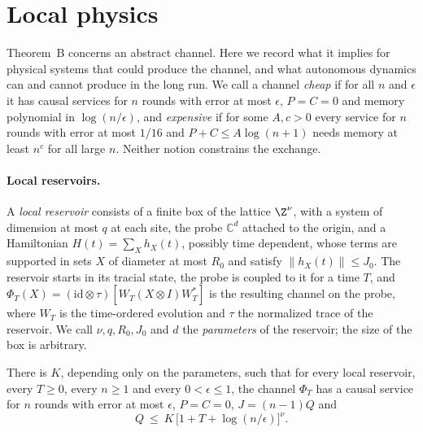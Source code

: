 \section{Local physics}\label{sec:physics}

Theorem~B concerns an abstract channel. Here we record what it implies for physical systems that could produce the channel, and what
autonomous dynamics can and cannot produce in the long run. We call a channel \emph{cheap} if for all $n$ and $\epsilon$ it has causal
services for $n$ rounds with error at most $\epsilon$, $P=C=0$ and memory polynomial in $\log(n/\epsilon)$, and \emph{expensive} if for some
$A,c>0$ every service for $n$ rounds with error at most $1/16$ and $P+C\le A\log(n+1)$ needs memory at least $n^c$ for all large $n$. Neither notion
constrains the exchange.

\paragraph{Local reservoirs.} A \emph{local reservoir} consists of a finite box of the lattice $\Z^\nu$, with a system of dimension at most $q$ at
each site, the probe $\mathbb C^d$ attached to the origin, and a Hamiltonian $H(t)=\sum_Xh_X(t)$, possibly time dependent, whose terms are supported
in sets $X$ of diameter at most $R_0$ and satisfy $\|h_X(t)\|\le J_0$. The reservoir starts in its tracial state, the probe is coupled to it for a
time $T$, and $\Phi_T(X)=(\mathrm{id}\otimes\tau)[W_T(X\otimes I)W_T^*]$ is the resulting channel on the probe, where $W_T$ is the time-ordered
evolution and $\tau$ the normalized trace of the reservoir. We call $\nu,q,R_0,J_0$ and $d$ the \emph{parameters} of the reservoir; the size of the
box is arbitrary.

\begin{proposition}\label{prop:light-cone}
There is $K$, depending only on the parameters, such that for every local reservoir, every $T\ge0$, every $n\ge1$ and every $0<\epsilon\le1$, the
channel $\Phi_T$ has a causal service for $n$ rounds with error at most $\epsilon$, $P=C=0$, $J=(n-1)Q$ and
\[
Q\ \le\ K\,\bigl[1+T+\log(n/\epsilon)\bigr]^\nu .
\]
\end{proposition}

